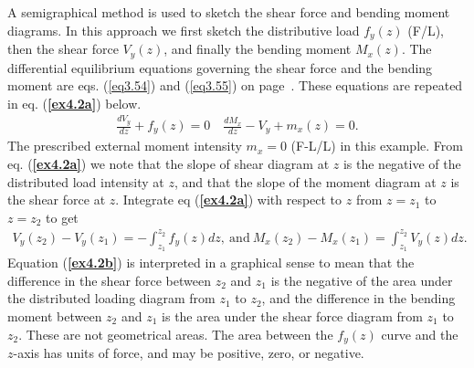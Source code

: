 \documentclass{AeroStructure-ERJohnson}
\begin{document}
\begin{example*}
A semigraphical method is used to sketch the shear force and bending moment diagrams. In this approach we first sketch the distributive load $f_{y}(z)$ (F/L), then the shear force $V_{y}(z)$, and finally the bending moment $M_{x}(z)$. The differential equilibrium equations governing the shear force and the bending moment are eqs. (\ref{eq3.54}) and (\ref{eq3.55}) on page~\pageref{eq3.55}. These equations are repeated in eq. (\textbf{\ref{ex4.2a}}) below.
\begin{align}\label{ex4.2a}
\frac{d V_{y}}{d z}+f_{y}(z)=0 \quad \frac{d M_{x}}{d z}-V_{y}+m_{x}(z)=0.
\end{align}
The prescribed external moment intensity $m_{x}=0$ (F-L/L) in this example. From eq. (\textbf{\ref{ex4.2a}}) we note that the slope of shear diagram at $z$ is the negative of the distributed load intensity at $z$, and that the slope of the moment diagram at $z$ is the shear force at $z$. Integrate eq (\textbf{\ref{ex4.2a}}) with respect to $z$ from $z = z_1$ to $z = z_2$ to get
\begin{align}\label{ex4.2b}
V_{y}\left(z_{2}\right)-V_{y}\left(z_{1}\right)=-\int_{z_{1}}^{z_{2}} f_{y}(z) d z,\ \text{and}\ M_{x}\left(z_{2}\right)-M_{x}\left(z_{1}\right)=\int_{z_{1}}^{z_{2}} V_{y}(z) d z.
\end{align}
Equation (\textbf{\ref{ex4.2b}}) is interpreted in a graphical sense to mean that the difference in the shear force between $z_2$ and $z_1$ is the negative of the area under the distributed loading diagram from $z_1$ to $z_2$, and the difference in the bending moment between $z_2$ and $z_1$ is the area under the shear force diagram from $z_1$ to $z_2$. These are not geometrical areas. The area between the $f_{y}(z)$ curve and the $z$-axis has units of force, and may be positive, zero, or negative.


\end{example*}
\end{document}
